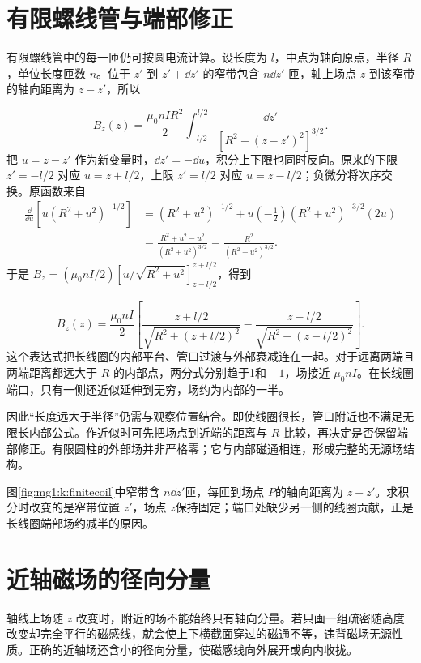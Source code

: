\section{有限螺线管与端部修正}
有限螺线管中的每一匝仍可按圆电流计算。设长度为 $l$，中点为轴向原点，半径 $R$，单位长度匝数 $n$。位于 $z'$ 到 $z'+\dd z'$ 的窄带包含 $n\dd z'$ 匝，轴上场点 $z$ 到该窄带的轴向距离为 $z-z'$，所以

\[
B_z(z)=\frac{\mu_0nIR^2}{2}\int_{-l/2}^{l/2}
\frac{\dd z'}{[R^2+(z-z')^2]^{3/2}}.
\]
把 $u=z-z'$ 作为新变量时，$\dd z'=-\dd u$，积分上下限也同时反向。原来的下限 $z'=-l/2$ 对应 $u=z+l/2$，上限 $z'=l/2$ 对应 $u=z-l/2$；负微分将次序交换。原函数来自
\[
 \begin{aligned}
 \frac{\dd}{\dd u}\left[u(R^2+u^2)^{-1/2}\right]
 &=(R^2+u^2)^{-1/2}
 +u\left(-\frac12\right)(R^2+u^2)^{-3/2}(2u)\\
 &=\frac{R^2+u^2-u^2}{(R^2+u^2)^{3/2}}
 =\frac{R^2}{(R^2+u^2)^{3/2}}.
 \end{aligned}
\]
于是 $B_z=(\mu_0nI/2)[u/\sqrt{R^2+u^2}]_{z-l/2}^{z+l/2}$，得到

\[
B_z(z)=\frac{\mu_0nI}{2}
\left[\frac{z+l/2}{\sqrt{R^2+(z+l/2)^2}}
-\frac{z-l/2}{\sqrt{R^2+(z-l/2)^2}}\right].
\]
这个表达式把长线圈的内部平台、管口过渡与外部衰减连在一起。对于远离两端且两端距离都远大于 $R$ 的内部点，两分式分别趋于1和 $-1$，场接近 $\mu_0nI$。在长线圈端口，只有一侧还近似延伸到无穷，场约为内部的一半。


因此“长度远大于半径”仍需与观察位置结合。即使线圈很长，管口附近也不满足无限长内部公式。作近似时可先把场点到近端的距离与 $R$ 比较，再决定是否保留端部修正。有限圆柱的外部场并非严格零；它与内部磁通相连，形成完整的无源场结构。


图\ref{fig:mg1:k:finitecoil}中窄带含 $n\dd z'$匝，每匝到场点 $P$的轴向距离为 $z-z'$。求积分时改变的是窄带位置 $z'$，场点 $z$保持固定；端口处缺少另一侧的线圈贡献，正是长线圈端部场约减半的原因。


\section{近轴磁场的径向分量}
轴线上场随 $z$ 改变时，附近的场不能始终只有轴向分量。若只画一组疏密随高度改变却完全平行的磁感线，就会使上下横截面穿过的磁通不等，违背磁场无源性质。正确的近轴场还含小的径向分量，使磁感线向外展开或向内收拢。


